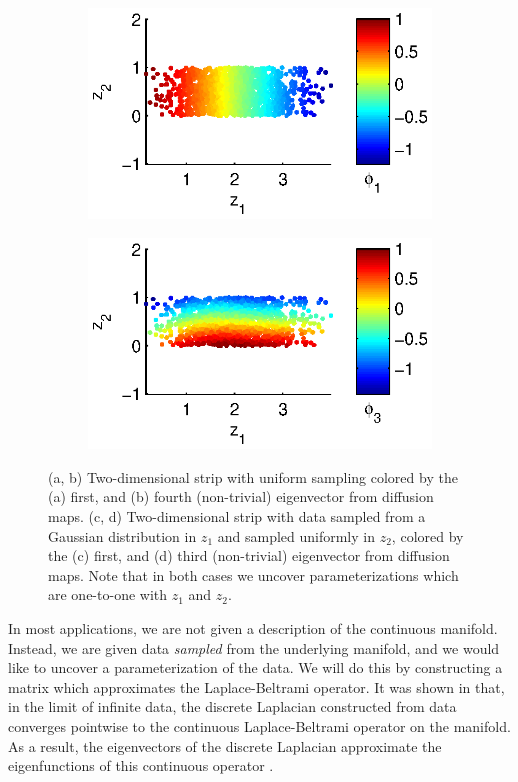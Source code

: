 \documentclass[preprint]{elsarticle}
\begin{document}
\begin{figure}[t]
\begin{subfigure}{0.45\textwidth}
\includegraphics[width=\textwidth]{strip_nonuniform1}
\caption{}
\end{subfigure}
%
\begin{subfigure}{0.45\textwidth}
\includegraphics[width=\textwidth]{strip_nonuniform2}
\caption{}
\end{subfigure}
\caption{(a, b) Two-dimensional strip with uniform sampling colored by the (a) first, and (b) fourth (non-trivial) eigenvector from diffusion maps. (c, d) Two-dimensional strip with data sampled from a Gaussian distribution in $z_1$ and sampled uniformly in $z_2$, colored by the (c) first, and (d) third (non-trivial) eigenvector from diffusion maps. Note that in both cases we uncover parameterizations which are one-to-one with $z_1$ and $z_2$. }
\label{fig:strip_evecs}
\end{figure}

In most applications, we are not given a description of the continuous manifold. 
%
Instead, we are given data {\em sampled} from the underlying manifold, and we would like to uncover a parameterization of the data.
%
We will do this by constructing a matrix which approximates the Laplace-Beltrami operator. 
%
It was shown in \cite{...} that, in the limit of infinite data, the discrete Laplacian constructed from data converges pointwise to the continuous Laplace-Beltrami operator on the manifold. 
%
As a result, the eigenvectors of the discrete Laplacian approximate the eigenfunctions of this continuous operator \cite{...}.
\end{document}
